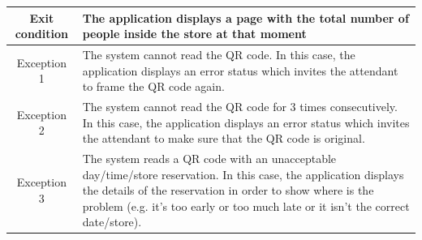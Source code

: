 \documentclass[table, 12pt]{article}
\begin{document}
\begin{minipage}{\textwidth}
\begin{longtable}{|c| p{10cm}|}
        \hline
        Exit condition   & The application displays a page with the total number of people inside the store at that moment
        \\
        \hline
        \hline
        Exception 1      & The system cannot read the QR code. In this case, the application displays an error status which invites the attendant to frame the QR code again.                                                                                                                 \\
        \hline
        Exception 2      & The system cannot read the QR code for 3 times consecutively. In this case, the application displays an error status which invites the attendant to make sure that the QR code is original.                                                                        \\
        \hline
        Exception 3      & The system reads a QR code with an unacceptable day/time/store reservation. In this case, the application displays the details of the reservation in order to show where is the problem (e.g. it's too early or too much late or it isn't the correct date/store). \\
        \hline
    \end{longtable}

\end{minipage}
\end{document}
